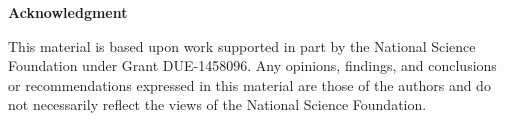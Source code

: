 \documentclass{article}
\begin{document}
\begin{center}
\large \textbf {Acknowledgment}
\end{center}

This material is based upon work supported in part by the National Science Foundation under Grant DUE-1458096. Any opinions, findings, and conclusions or recommendations expressed in this material are those of the authors and do not necessarily reflect the views of the National Science Foundation.

\medskip



\end{document}
